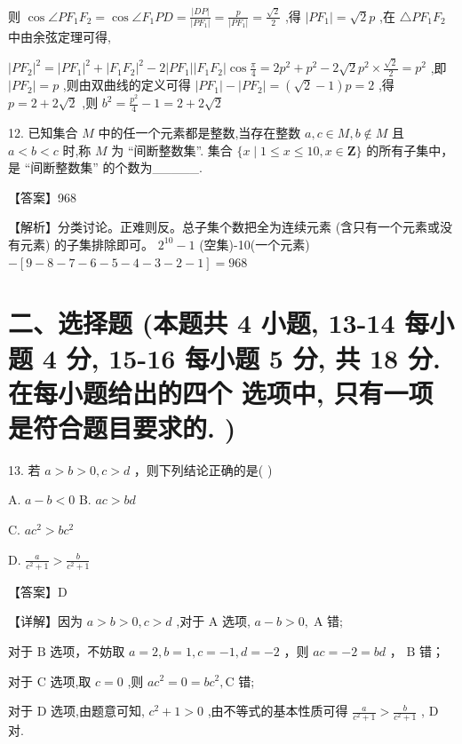 \documentclass[10pt]{article}
\begin{document}
则 \(\cos \angle P{F}_{1}{F}_{2} = \cos \angle {F}_{1}{PD} = \frac{\left| DP\right| }{\left| P{F}_{1}\right| } = \frac{p}{\left| P{F}_{1}\right| } = \frac{\sqrt{2}}{2}\) ,得 \(\left| {P{F}_{1}}\right|  = \sqrt{2}p\) ,在 \(\bigtriangleup P{F}_{1}{F}_{2}\) 中由余弦定理可得,

\({\left| P{F}_{2}\right| }^{2} = {\left| P{F}_{1}\right| }^{2} + {\left| {F}_{1}{F}_{2}\right| }^{2} - 2\left| {P{F}_{1}}\right| \left| {{F}_{1}{F}_{2}}\right| \cos \frac{\pi }{4} = 2{p}^{2} + {p}^{2} - 2\sqrt{2}{p}^{2} \times  \frac{\sqrt{2}}{2} = {p}^{2}\) ,即 \(\left| {P{F}_{2}}\right|  = p\) ,则由双曲线的定义可得 \(\left| {P{F}_{1}}\right|  - \left| {P{F}_{2}}\right|  = \left( {\sqrt{2} - 1}\right) p = 2\) ,得 \(p = 2 + 2\sqrt{2}\) ,则 \({b}^{2} = \frac{{p}^{2}}{4} - 1 = 2 + 2\sqrt{2}\)

12. 已知集合 \(M\) 中的任一个元素都是整数,当存在整数 \(a,c \in  M,b \notin  M\) 且 \(a < b < c\) 时,称 \(M\) 为 “间断整数集”. 集合 \(\{ x \mid  1 \leq  x \leq  {10},x \in  \mathbf{Z}\}\) 的所有子集中，是 “间断整数集” 的个数为\_\_\_\_\_.

【答案】968

【解析】分类讨论。正难则反。总子集个数把全为连续元素 (含只有一个元素或没有元素) 的子集排除即可。 \({2}^{10} - 1\) (空集)-10(一个元素) \(- \left\lbrack  {9 - 8 - 7 - 6 - 5 - 4 - 3 - 2 - 1}\right\rbrack   = {968}\)

\section*{二、选择题 (本题共 4 小题, 13-14 每小题 4 分, 15-16 每小题 5 分, 共 18 分. 在每小题给出的四个 选项中, 只有一项是符合题目要求的. )}

13. 若 \(a > b > 0,c > d\) ，则下列结论正确的是( )

A. \(a - b < 0\) B. \({ac} > {bd}\)

C. \(a{c}^{2} > b{c}^{2}\)

D. \(\frac{a}{{c}^{2} + 1} > \frac{b}{{c}^{2} + 1}\)

【答案】D

【详解】因为 \(a > b > 0,c > d\) ,对于 \(\mathrm{A}\) 选项, \(a - b > 0,\mathrm{\;A}\) 错;

对于 \(\mathrm{B}\) 选项，不妨取 \(a = 2,b = 1,c =  - 1,d =  - 2\) ，则 \({ac} =  - 2 = {bd}\) ， \(\mathrm{B}\) 错；

对于 \(\mathrm{C}\) 选项,取 \(c = 0\) ,则 \(a{c}^{2} = 0 = b{c}^{2},\mathrm{C}\) 错;

对于 \(\mathrm{D}\) 选项,由题意可知, \({c}^{2} + 1 > 0\) ,由不等式的基本性质可得 \(\frac{a}{{c}^{2} + 1} > \frac{b}{{c}^{2} + 1}\) , D 对.
\end{document}
